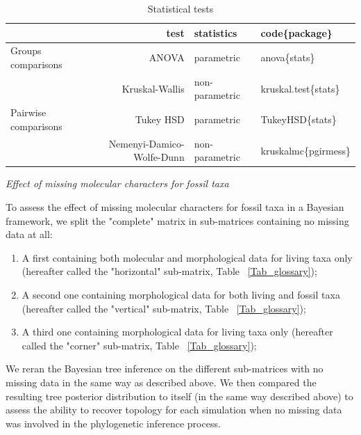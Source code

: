 \documentclass[12pt,letterpaper]{article}
\renewcommand{\subsection}[1]{%
\bigskip
\begin{center}
\begin{large}
\normalfont\itshape #1
\end{large}
\end{center}}
\begin{document}
\begin{table}[ht]
\caption{Statistical tests}
\centering
\begin{tabular}{lrll}
  \hline
   & test & statistics & code\{package\} \\ [0.5ex]
  \hline
  Groups comparisons & ANOVA & parametric & anova\{stats\} \\ [0.5ex]
                     & Kruskal-Wallis & non-parametric & kruskal.test\{stats\} \\[0.5ex]
  \hline
  Pairwise comparisons & Tukey HSD & parametric & TukeyHSD\{stats\} \\ [0.5ex]
                       & Nemenyi-Damico-Wolfe-Dunn & non-parametric & kruskalmc\{pgirmess\} \\ [0.5ex]
  \hline
\end{tabular}
\end{table}
\label{Stats_test}

\subsection{Effect of missing molecular characters for fossil taxa} %
To assess the effect of missing molecular characters for fossil taxa in a Bayesian framework, we split the "complete" matrix in sub-matrices containing no missing data at all:
\begin{enumerate}
\item
A first containing both molecular and morphological data for living taxa only (hereafter called the "horizontal" sub-matrix, Table ~\ref{Tab_glossary});
\item
A second one containing morphological data for both living and fossil taxa (hereafter called the "vertical" sub-matrix, Table ~\ref{Tab_glossary});
\item
A third one containing morphological data for living taxa only (hereafter called the "corner" sub-matrix, Table ~\ref{Tab_glossary});
\end{enumerate}
We reran the Bayesian tree inference on the different sub-matrices with no missing data in the same way as described above.
We then compared the resulting tree posterior distribution to itself (in the same way described above) to assess the ability to recover topology for each simulation when no missing data was involved in the phylogenetic inference process.

\end{document}
